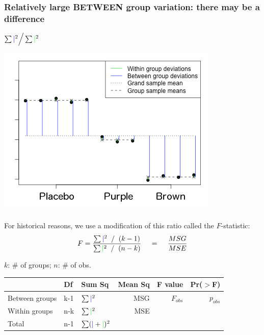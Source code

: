 \documentclass[slidestop,compress,mathserif,12pt,t,professionalfonts,xcolor=table]{beamer}
\begin{document}
\begin{frame}
\frametitle{Relatively large BETWEEN group variation: there may be a difference}

\centering
\(
\sum {\color{blue} \mid}^2 \Big/ \sum {\color{green} \mid}^2
\)
    
    \includegraphics[scale=0.6]{Figures/anova-lots-of-between-group-jelly-bean.png}

\end{frame}


\begin{frame}
  \frametitle{}

For historical reasons, we use a modification of this ratio called the $F$-statistic:
\[
F = \frac{\sum {\color{blue} \mid}^2 \; \; / \; \; (k - 1)}{\sum {\color{green} \mid}^2 \; \; / \; \; (n - k)}
\hspace{12pt} = \hspace{12pt} \frac{MSG}{MSE}
\]

$k$: \# of groups; $n$: \# of obs.

\pause

\begin{center}
\small
\begin{tabular}{lllrrr}
  \hline
  & Df  & Sum Sq & Mean Sq & F value & Pr($>$F) \\ 
  \hline
  Between groups & k-1 & $\sum {\color{blue}\mid}^2$  & MSG & $F_{obs}$ & $p_{obs}$ \\ 
  Within groups & n-k & $\sum {\color{green}\mid}^2$ & MSE &		 &  \\ 
   \hline
Total			& n-1 & $\sum ({\color{blue}\mid} + {\color{green}\mid})^2$    &                &                &
\end{tabular}
\end{center}

\end{frame}
\end{document}
